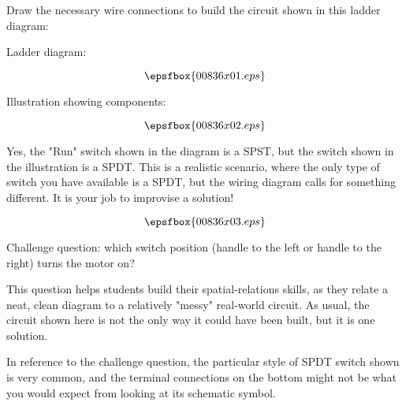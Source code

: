 

Draw the necessary wire connections to build the circuit shown in this ladder diagram:

\vskip 10pt

Ladder diagram:

$$\epsfbox{00836x01.eps}$$

\vskip 10pt

Illustration showing components:

$$\epsfbox{00836x02.eps}$$

\vskip 10pt

Yes, the "Run" switch shown in the diagram is a SPST, but the switch shown in the illustration is a SPDT.  This is a realistic scenario, where the only type of switch you have available is a SPDT, but the wiring diagram calls for something different.  It is your job to improvise a solution!







$$\epsfbox{00836x03.eps}$$

\vskip 10pt

Challenge question: which switch position (handle to the left or handle to the right) turns the motor on?







This question helps students build their spatial-relations skills, as they relate a neat, clean diagram to a relatively "messy" real-world circuit.  As usual, the circuit shown here is not the only way it could have been built, but it is one solution.

In reference to the challenge question, the particular style of SPDT switch shown is very common, and the terminal connections on the bottom might not be what you would expect from looking at its schematic symbol.




